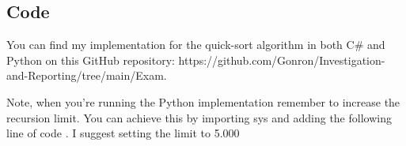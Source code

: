 \subsection{Code}\label{comp_code}

You can find my implementation for the quick-sort algorithm in both C\# and Python on this GitHub repository: https://github.com/Gonron/Investigation-and-Reporting/tree/main/Exam.

\noindent Note, when you're running the Python implementation remember to increase the recursion limit. You can achieve this by importing sys and adding the following line of code . I suggest setting the limit to 5.000 



